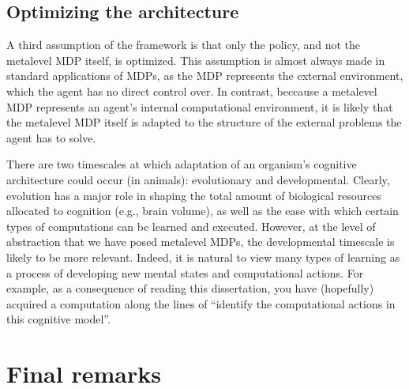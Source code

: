 \subsection{Optimizing the architecture}

A third assumption of the framework is that only the policy, and not the metalevel MDP itself, is optimized. This assumption is almost always made in standard applications of MDPs, as the MDP represents the external environment, which the agent has no direct control over. In contrast, beccause a metalevel MDP represents an agent's internal computational environment, it is likely that the metalevel MDP itself is adapted to the structure of the external problems the agent has to solve.

There are two timescales at which adaptation of an organism's cognitive architecture could occur (in animals): evolutionary and developmental. Clearly, evolution has a major role in shaping the total amount of biological resources allocated to cognition (e.g., brain volume), as well as the ease with which certain types of computations can be learned and executed. However, at the level of abstraction that we have posed metalevel MDPs, the developmental timescale is likely to be more relevant. Indeed, it is natural to view many types of learning as a process of developing new mental states and computational actions. For example, as a consequence of reading this dissertation, you have (hopefully) acquired a computation along the lines of ``identify the computational actions in this cognitive model''.


\section{Final remarks}



